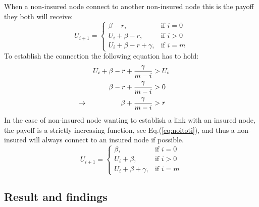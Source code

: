 When a non-insured node connect to another non-insured node this is the payoff they both will receive:
\begin{equation}
    U_{i+1}= 
\begin{cases}
     \beta -r,& \text{if } i = 0\\
    U_{i}+\beta -r,& \text{if }  i>0\\
    U_{i}+\beta -r +\gamma,& \text{if } i=m
\end{cases}
\label{eq:noitonoti}
\end{equation}
To establish the connection the following equation has to hold:
\begin{eqnarray}
U_{i}+\beta-r+\frac{\gamma}{m-i}&>U_{i} \nonumber \\ 
\beta-r+\frac{\gamma}{m-i}&>0 \nonumber \\ 
\llap{$\rightarrow$\hspace{50pt}} \beta+\frac{\gamma}{m-i}&>r
\end{eqnarray}
In the case of non-insured node wanting to establish a link with an insured node, the payoff is a strictly increasing function, see Eq.(\ref{eq:noitoti}), and thus a non-insured will always connect to an insured node if possible.
\begin{equation}
    U_{i+1}= 
\begin{cases}
    \beta,& \text{if } i = 0\\
    U_{i}+\beta,& \text{if }  i>0\\
    U_{i}+\beta +\gamma,& \text{if } i=m
\end{cases}
\label{eq:noitoti}
\end{equation}

\subsection{Result and findings}

